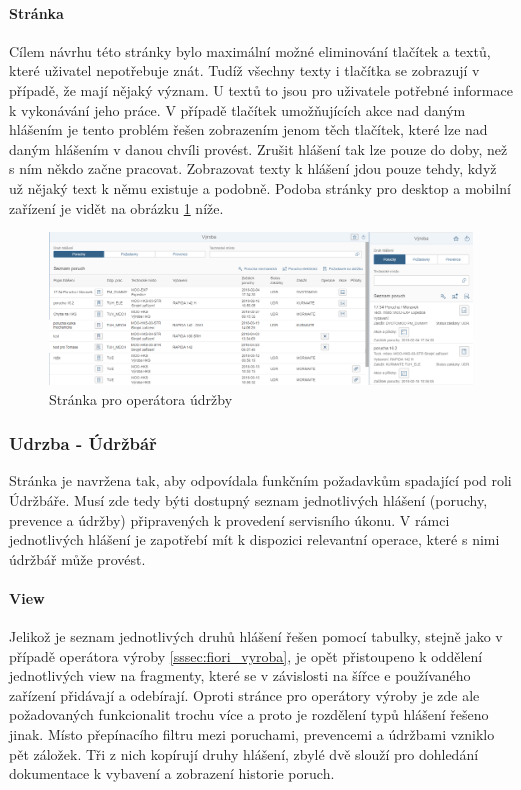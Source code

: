 \documentclass[thesis=M,czech]{FITthesis}[2012/06/26]
\begin{document}
\paragraph{Stránka}
Cílem návrhu této stránky bylo maximální možné eliminování tlačítek a textů, které uživatel nepotřebuje znát. Tudíž všechny texty i tlačítka se zobrazují v případě, že mají nějaký význam. U textů to jsou pro uživatele potřebné informace k vykonávání jeho práce. V případě tlačítek umožňujících akce nad daným hlášením je tento problém řešen zobrazením jenom těch tlačítek, které lze nad daným hlášením v danou chvíli provést. Zrušit hlášení tak lze pouze do doby, než s ním někdo začne pracovat. Zobrazovat texty k hlášení jdou pouze tehdy, když už nějaký text k němu existuje a podobně. Podoba stránky pro desktop a mobilní zařízení je vidět na obrázku \ref{img:view_vyroba} níže.
\begin{figure}[H]
	\centering
	\includegraphics[width=1\textwidth]{images/view_vyroba}
	\caption{Stránka pro operátora údržby}
	\label{img:view_vyroba}
\end{figure}

\subsubsection{Udrzba - Údržbář}
\label{sssec:fiori_udrzba}
Stránka je navržena tak, aby odpovídala funkčním požadavkům spadající pod roli Údržbáře. Musí zde tedy býti dostupný seznam jednotlivých hlášení (poruchy, prevence a údržby) připravených k provedení servisního úkonu. V rámci jednotlivých hlášení je zapotřebí mít k dispozici relevantní operace, které s nimi údržbář může provést.
\paragraph{View}
Jelikož je seznam jednotlivých druhů hlášení řešen pomocí tabulky, stejně jako v případě operátora výroby \ref{sssec:fiori_vyroba}, je opět přistoupeno k oddělení jednotlivých view na fragmenty, které se v závislosti na šířce e používaného zařízení přidávají a odebírají. Oproti stránce pro operátory výroby je zde ale požadovaných funkcionalit trochu více a proto je rozdělení typů hlášení řešeno jinak. Místo přepínacího filtru mezi poruchami, prevencemi a údržbami vzniklo pět záložek. Tři z nich kopírují druhy hlášení, zbylé dvě slouží pro dohledání dokumentace k vybavení a zobrazení historie poruch.
\end{document}

